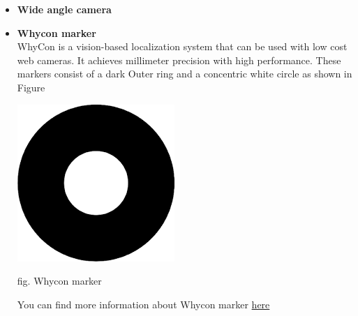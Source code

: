 \documentclass[a4paper,12pt,oneside]{book}
\begin{document}
\begin{itemize}
\begin{itemize}
    \end{itemize}
  \item \textbf{Wide angle camera}
  \item \textbf{Whycon marker\\}
  WhyCon is a vision-based localization system that can be used with low cost web cameras. It achieves millimeter precision with high performance. These markers consist of a dark Outer ring and a concentric white circle as shown in Figure
   \begin{center}
         \includegraphics{whycon.png}
    \end{center}
    \begin{center}
          fig. Whycon marker
   \end{center}
  You can find more information about Whycon marker \href{https://github.com/eYSIP-2018/Autotuning-of-Controller-For-Drone/blob/master/Whycon_understanding.pdf}{here}
\end{itemize}
\end{document}
